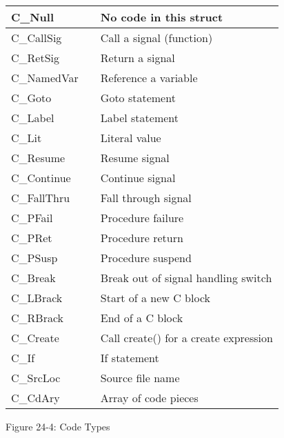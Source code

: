 \begin{center}
\tabletail{}
\tablelasttail{}
\begin{xtabular}{|m{0.9906598in}|m{0.42545983in}|m{2.42956in}|}
\hline
{\ttfamily C\_Null} &
 &
 No code in this struct\\\hline
{\ttfamily C\_CallSig} &
 &
 Call a signal (function)\\\hline
 C\_RetSig &
 &
 Return a signal\\\hline
 C\_NamedVar &
 &
 Reference a variable\\\hline
 C\_Goto &
 &
 Goto statement\\\hline
 C\_Label &
 &
 Label statement\\\hline
 C\_Lit &
 &
 Literal value\\\hline
 C\_Resume &
 &
 Resume signal\\\hline
 C\_Continue &
 &
 Continue signal\\\hline
 C\_FallThru &
 &
 Fall through signal\\\hline
 C\_PFail &
 &
 Procedure failure\\\hline
 C\_PRet &
 &
 Procedure return\\\hline
 C\_PSusp &
 &
 Procedure suspend\\\hline
 C\_Break &
 &
 Break out of signal handling switch\\\hline
 C\_LBrack &
 &
 Start of a new C block\\\hline
 C\_RBrack &
 &
 End of a C block\\\hline
 C\_Create &
 &
 Call create() for a create expression\\\hline
 C\_If &
 &
 If statement\\\hline
 C\_SrcLoc &
 &
 Source file name\\\hline
 C\_CdAry &
 &
 Array of code pieces\\\hline
\end{xtabular}
\end{center}
{\centering{}
Figure 24-4: Code Types
\par}


